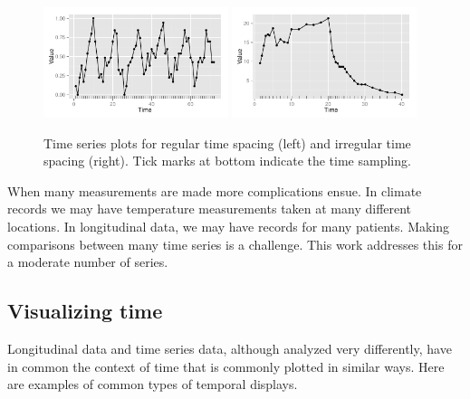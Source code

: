\documentclass[12pt]{article}
\begin{document}
\begin{figure}[h]
\begin{centering}
\includegraphics[width=0.48\textwidth]{graph/pipeline-01-regular} \includegraphics[width=0.48\textwidth]{graph/pipeline-01-irregular}
\end{centering}

\caption{\label{fig:Time-series-plots}Time series plots for regular time spacing
 (left) and irregular time spacing  (right). Tick marks at bottom indicate the time sampling.}
\end{figure}

When many measurements are made more complications ensue. In climate records we may have temperature measurements taken at many different locations. In longitudinal data, we may have records for many patients. Making comparisons between many time series is a challenge. This work addresses this for a moderate number of series.



\subsection{Visualizing time}

Longitudinal data and time series data, although analyzed very differently, have in common the context of time that is commonly plotted in similar ways. Here are examples of common types of temporal displays.
\end{document}
